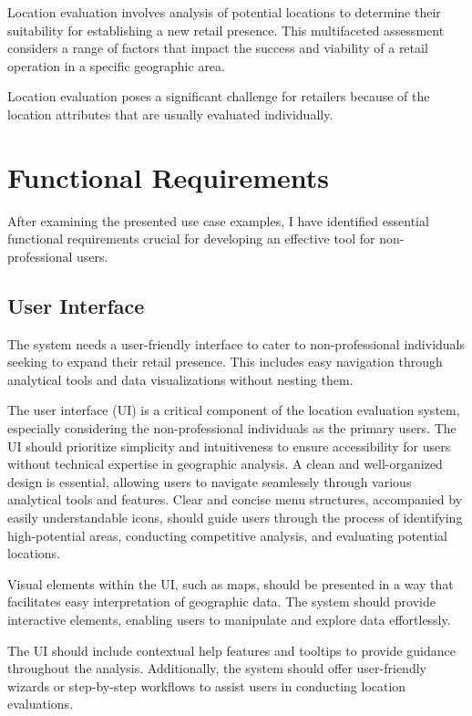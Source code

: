 Location evaluation involves analysis of potential locations to determine their suitability for establishing a new retail presence. This multifaceted assessment considers a range of factors that impact the success and viability of a retail operation in a specific geographic area.

Location evaluation poses a significant challenge for retailers because of the location attributes that are usually evaluated individually.

\section{Functional Requirements}

After examining the presented use case examples, I have identified essential functional requirements crucial for developing an effective tool for non-professional users.

\subsection{User Interface}

The system needs a user-friendly interface to cater to non-professional individuals seeking to expand their retail presence. This includes easy navigation through analytical tools and data visualizations without nesting them.

The user interface (UI) is a critical component of the location evaluation system, especially considering the non-professional individuals as the primary users. The UI should prioritize simplicity and intuitiveness to ensure accessibility for users without technical expertise in geographic analysis. A clean and well-organized design is essential, allowing users to navigate seamlessly through various analytical tools and features. Clear and concise menu structures, accompanied by easily understandable icons, should guide users through the process of identifying high-potential areas, conducting competitive analysis, and evaluating potential locations.

Visual elements within the UI, such as maps, should be presented in a way that facilitates easy interpretation of geographic data. The system should provide interactive elements, enabling users to manipulate and explore data effortlessly.

The UI should include contextual help features and tooltips to provide guidance throughout the analysis. Additionally, the system should offer user-friendly wizards or step-by-step workflows to assist users in conducting location evaluations.

